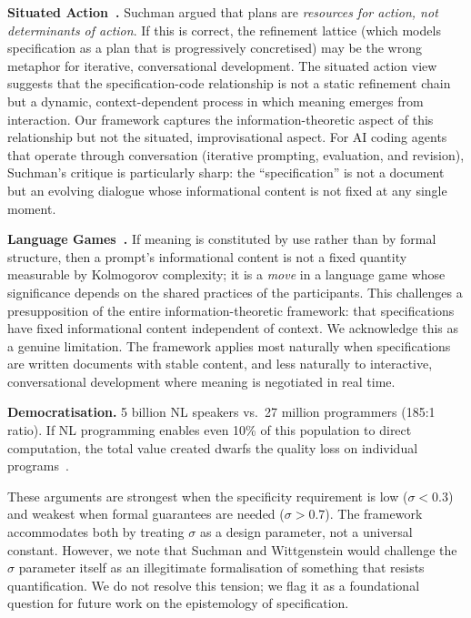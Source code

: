 \documentclass[11pt, a4paper, logo, copyright]{googledeepmind}
\begin{document}
\textbf{Situated Action~\citep{suchman1987plans}.} Suchman argued that plans are \emph{resources for action, not determinants of action}. If this is correct, the refinement lattice (which models specification as a plan that is progressively concretised) may be the wrong metaphor for iterative, conversational development. The situated action view suggests that the specification-code relationship is not a static refinement chain but a dynamic, context-dependent process in which meaning emerges from interaction. Our framework captures the information-theoretic aspect of this relationship but not the situated, improvisational aspect. For AI coding agents that operate through conversation (iterative prompting, evaluation, and revision), Suchman's critique is particularly sharp: the ``specification'' is not a document but an evolving dialogue whose informational content is not fixed at any single moment.

\textbf{Language Games~\citep{wittgenstein1953philosophical}.} If meaning is constituted by use rather than by formal structure, then a prompt's informational content is not a fixed quantity measurable by Kolmogorov complexity; it is a \emph{move} in a language game whose significance depends on the shared practices of the participants. This challenges a presupposition of the entire information-theoretic framework: that specifications have fixed informational content independent of context. We acknowledge this as a genuine limitation. The framework applies most naturally when specifications are written documents with stable content, and less naturally to interactive, conversational development where meaning is negotiated in real time.

\textbf{Democratisation.} 5 billion NL speakers vs.\ 27 million programmers (185:1 ratio). If NL programming enables even 10\% of this population to direct computation, the total value created dwarfs the quality loss on individual programs~\citep{litt2023malleable, altman2024intelligence}.

These arguments are strongest when the specificity requirement is low ($\sigma < 0.3$) and weakest when formal guarantees are needed ($\sigma > 0.7$). The framework accommodates both by treating $\sigma$ as a design parameter, not a universal constant. However, we note that Suchman and Wittgenstein would challenge the $\sigma$ parameter itself as an illegitimate formalisation of something that resists quantification. We do not resolve this tension; we flag it as a foundational question for future work on the epistemology of specification.
\end{document}
